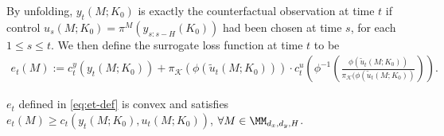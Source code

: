 By unfolding, $y_t(M;K_0)$ is exactly the counterfactual observation at time $t$ if control $u_s(M;K_0) = \pi^M(y_{s:s-H}(K_0))$ had been chosen at time $s$, for each $1 \leq s \leq t$. We then define the surrogate loss function at time $t$ to be
\begin{align}
\label{eq:et-def}
e_t(M) := c_t^y(y_t(M; K_0))+ \pi_{\mathcal{K}}(\phi(\tilde{u}_t(M;K_0))) \cdot c_t^u(\phi^{-1}(\frac{\phi(\tilde{u}_t(M;K_0))}{\pi_{\mathcal{K}}(\phi(\tilde{u}_t(M;K_0))})).
\end{align}


\begin{observation}
\label{obs:ext}
$e_t$ defined in \cref{eq:et-def} is convex and satisfies $e_t(M)\ge c_t(y_t(M;K_0),u_t(M;K_0))$, $\forall M\in\MM_{d_x,d_y,H}$.
\end{observation}




